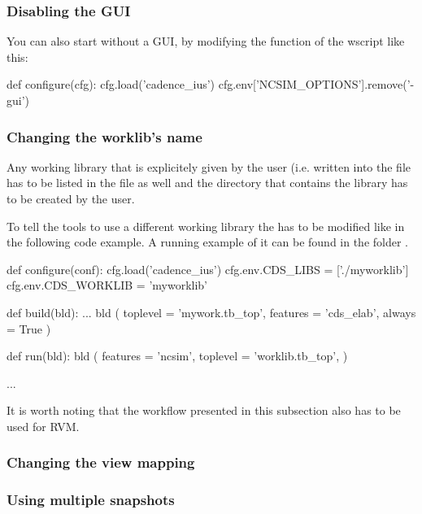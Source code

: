 \subsubsection{Disabling the  GUI}
You can also start  without a GUI, by modifying the 
function of the wscript like this:
\begin{lstwscript}
def configure(cfg):
    cfg.load('cadence_ius')
    cfg.env['NCSIM_OPTIONS'].remove('-gui')
\end{lstwscript}

\subsubsection{Changing the worklib's name}
Any working library that is explicitely given by the user (i.e. written into
the  file has to be listed in the  file as well and the
directory that contains the library has to be created by the user.

To tell the  tools to use a different working library the
 has to be modified like in the following code example. A running
example of it can be found in the folder
.

\begin{lstwscript}
def configure(conf):
    cfg.load('cadence_ius')
    cfg.env.CDS_LIBS = ['./myworklib']
    cfg.env.CDS_WORKLIB = 'myworklib'

def build(bld):
    ...
    bld (
        toplevel = 'mywork.tb_top',
        features = 'cds_elab',
        always = True
    )

def run(bld):
    bld (
        features = 'ncsim',
        toplevel = 'worklib.tb_top',
    )

...
\end{lstwscript}

It is worth noting that the workflow presented in this subsection also has to
be used for \gls{RVM}.

\subsubsection{Changing the view mapping}
\subsubsection{Using multiple snapshots}

